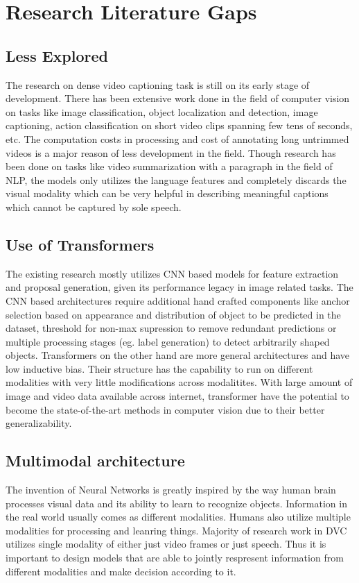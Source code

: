 \section{Research Literature Gaps}
\subsection{Less Explored}
\par The research on dense video captioning task is still on its early stage of development. There has been extensive work done in the field of computer vision on tasks like image classification, object localization and detection, image captioning, action classification on short video clips spanning few tens of seconds, etc. The computation costs in processing and cost of annotating long untrimmed videos is a major reason of less development in the field. Though research has been done on tasks like video summarization with a paragraph in the field of NLP, the models only utilizes the language features and completely discards the visual modality which can be very helpful in describing meaningful captions which cannot be captured by sole speech. 

\subsection{Use of Transformers}
\par The existing research mostly utilizes CNN based models for feature extraction and proposal generation, given its performance legacy in image related tasks. The CNN based architectures require additional hand crafted components like anchor selection based on appearance and distribution of object to be predicted in the dataset, threshold for non-max supression to remove redundant predictions or multiple processing stages (eg. label generation) to detect arbitrarily shaped objects. Transformers on the other hand are more general architectures and have low inductive bias. Their structure has the capability to run on different modalities with very little modifications across modalitites. With large amount of image and video data available across internet, transformer have the potential to become the state-of-the-art methods in computer vision due to their better generalizability.

\subsection{Multimodal architecture}
\par The invention of Neural Networks is greatly inspired by the way human brain processes visual data and its ability to learn to recognize objects. Information in the real world usually comes as different modalities. Humans also utilize multiple modalities for processing and leanring things. Majority of research work in DVC utilizes single modality of either just video frames or just speech. Thus it is important to design models that are able to jointly respresent information from different modalities and make decision according to it.

